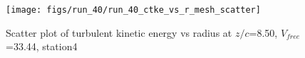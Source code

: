 \begin{figure}[H]
\centering
\texttt{[image: figs/run\_40/run\_40\_ctke\_vs\_r\_mesh\_scatter]}
\caption{Scatter plot of turbulent kinetic energy vs radius at $z/c$=8.50, $V_{free}$=33.44, station4}
\label{fig:run_40_ctke_vs_r_mesh_scatter}
\end{figure}


